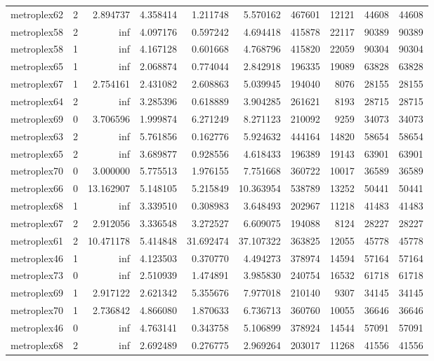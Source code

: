 \begin{longtable}{|l|r|r|r|r|r|r|r|r|r|}
metroplex62 & 2 & 2.894737 & 4.358414 & 1.211748 & 5.570162 & 467601 & 12121 & 44608 & 44608 \\
metroplex58 & 2 & inf & 4.097176 & 0.597242 & 4.694418 & 415878 & 22117 & 90389 & 90389 \\
metroplex58 & 1 & inf & 4.167128 & 0.601668 & 4.768796 & 415820 & 22059 & 90304 & 90304 \\
metroplex65 & 1 & inf & 2.068874 & 0.774044 & 2.842918 & 196335 & 19089 & 63828 & 63828 \\
metroplex67 & 1 & 2.754161 & 2.431082 & 2.608863 & 5.039945 & 194040 & 8076 & 28155 & 28155 \\
metroplex64 & 2 & inf & 3.285396 & 0.618889 & 3.904285 & 261621 & 8193 & 28715 & 28715 \\
metroplex69 & 0 & 3.706596 & 1.999874 & 6.271249 & 8.271123 & 210092 & 9259 & 34073 & 34073 \\
metroplex63 & 2 & inf & 5.761856 & 0.162776 & 5.924632 & 444164 & 14820 & 58654 & 58654 \\
metroplex65 & 2 & inf & 3.689877 & 0.928556 & 4.618433 & 196389 & 19143 & 63901 & 63901 \\
metroplex70 & 0 & 3.000000 & 5.775513 & 1.976155 & 7.751668 & 360722 & 10017 & 36589 & 36589 \\
metroplex66 & 0 & 13.162907 & 5.148105 & 5.215849 & 10.363954 & 538789 & 13252 & 50441 & 50441 \\
metroplex68 & 1 & inf & 3.339510 & 0.308983 & 3.648493 & 202967 & 11218 & 41483 & 41483 \\
metroplex67 & 2 & 2.912056 & 3.336548 & 3.272527 & 6.609075 & 194088 & 8124 & 28227 & 28227 \\
metroplex61 & 2 & 10.471178 & 5.414848 & 31.692474 & 37.107322 & 363825 & 12055 & 45778 & 45778 \\
metroplex46 & 1 & inf & 4.123503 & 0.370770 & 4.494273 & 378974 & 14594 & 57164 & 57164 \\
metroplex73 & 0 & inf & 2.510939 & 1.474891 & 3.985830 & 240754 & 16532 & 61718 & 61718 \\
metroplex69 & 1 & 2.917122 & 2.621342 & 5.355676 & 7.977018 & 210140 & 9307 & 34145 & 34145 \\
metroplex70 & 1 & 2.736842 & 4.866080 & 1.870633 & 6.736713 & 360760 & 10055 & 36646 & 36646 \\
metroplex46 & 0 & inf & 4.763141 & 0.343758 & 5.106899 & 378924 & 14544 & 57091 & 57091 \\
metroplex68 & 2 & inf & 2.692489 & 0.276775 & 2.969264 & 203017 & 11268 & 41556 & 41556 \\

\end{longtable}
